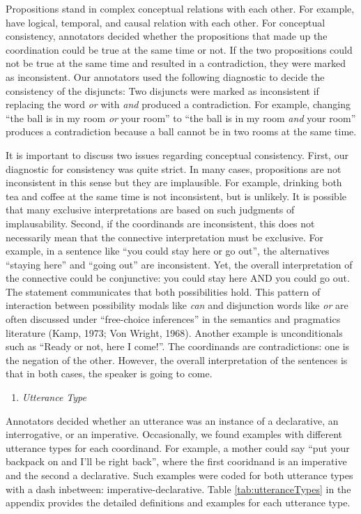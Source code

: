 \documentclass[,man,floatsintext]{apa6}
\providecommand{\tightlist}{%
  \setlength{\itemsep}{0pt}\setlength{\parskip}{0pt}}
\begin{document}
Propositions stand in complex conceptual relations with each other. For example, have logical, temporal, and causal relation with each other. For conceptual consistency, annotators decided whether the propositions that made up the coordination could be true at the same time or not. If the two propositions could not be true at the same time and resulted in a contradiction, they were marked as inconsistent. Our annotators used the following diagnostic to decide the consistency of the disjuncts: Two disjuncts were marked as inconsistent if replacing the word \emph{or} with \emph{and} produced a contradiction. For example, changing \enquote{the ball is in my room \emph{or} your room} to \enquote{the ball is in my room \emph{and} your room} produces a contradiction because a ball cannot be in two rooms at the same time.

It is important to discuss two issues regarding conceptual consistency. First, our diagnostic for consistency was quite strict. In many cases, propositions are not inconsistent in this sense but they are implausible. For example, drinking both tea and coffee at the same time is not inconsistent, but is unlikely. It is possible that many exclusive interpretations are based on such judgments of implausability. Second, if the coordinands are inconsistent, this does not necessarily mean that the connective interpretation must be exclusive. For example, in a sentence like \enquote{you could stay here or go out}, the alternatives \enquote{staying here} and \enquote{going out} are inconsistent. Yet, the overall interpretation of the connective could be conjunctive: you could stay here AND you could go out. The statement communicates that both possibilities hold. This pattern of interaction between possibility modals like \emph{can} and disjunction words like \emph{or} are often discussed under \enquote{free-choice inferences} in the semantics and pragmatics literature (Kamp, 1973; Von Wright, 1968). Another example is unconditionals such as \enquote{Ready or not, here I come!}. The coordinands are contradictions: one is the negation of the other. However, the overall interpretation of the sentences is that in both cases, the speaker is going to come.

\begin{enumerate}
\def\labelenumi{\arabic{enumi}.}
\setcounter{enumi}{2}
\tightlist
\item
  \emph{Utterance Type}
\end{enumerate}

Annotators decided whether an utterance was an instance of a declarative, an interrogative, or an imperative. Occasionally, we found examples with different utterance types for each coordinand. For example, a mother could say \enquote{put your backpack on and I'll be right back}, where the first cooridnand is an imperative and the second a declarative. Such examples were coded for both utterance types with a dash inbetween: imperative-declarative. Table \ref{tab:utteranceTypes} in the appendix provides the detailed definitions and examples for each utterance type.
\end{document}
